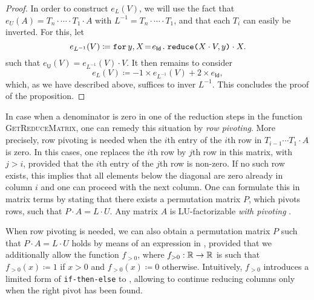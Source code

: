 \begin{proof}
In order to construct $e_L(V)$, we will use the fact that $e_U(A)=T_n\cdot\cdots\cdot T_1\cdot A$ with $L^{-1}=T_n\cdot\cdots\cdot T_1$, and that each $T_i$ can easily be inverted. For this, let
    $$
    e_{L^{-1}}(V) \coloneqq    \initf{e_{\mathsf{Id}}}{y}{X}{\red{X\cdot V}{y}\cdot X}.
    $$
    such that	$e_{\mathsf{U}}(V)=  e_{L^{-1}}(V) \cdot V$.%
It then remains to consider
    $$
    e_{L}(V) \coloneqq    -1\times e_{L^{-1}}(V) + 2\times e_{\mathsf{Id}},
    $$
which, as we have described above, suffices to inver $L^{-1}$. This concludes the proof of the proposition.    
\end{proof}


In case when  a denominator is zero in one of the reduction steps in the function
\textsc{GetReduceMatrix}, one can remedy this situation by \textit{row pivoting}.  More precisely, row pivoting is needed when the $i$th entry of the
$i$th row in $T_{i-1}\cdots T_1\cdot A$ is zero. In this cases, one replaces the $i$th row by  $j$th row in this matrix, with $j>i$, provided that the $i$th entry of the $j$th row is non-zero. If no such row exists, this implies that all elements below the diagonal are zero already in column $i$ and one can proceed with the next column. One can formulate this in matrix terms by stating that there exists a permutation matrix $P$, which pivots rows, such that $P\cdot A=L\cdot U$. Any matrix $A$ is LU-factorizable \textit{with pivoting} \cite{num}.

When row pivoting is needed, we can also obtain a permutation matrix
$P$ such that $P\cdot A=L\cdot U$ holds by means of an expression in \langfor, provided
that we additionally allow the function $f_{>0}$, 
where $f_{>0}:\RR\to\RR$ is such that $f_{>0}(x)\coloneqq  1$ if $x>0$ and $f_{>0}(x)\coloneqq  0$ otherwise.
Intuitively, $f_{>0}$ introduces a limited form of \texttt{if-then-else} to \langfor, allowing to continue reducing columns only when the right pivot has been found.


